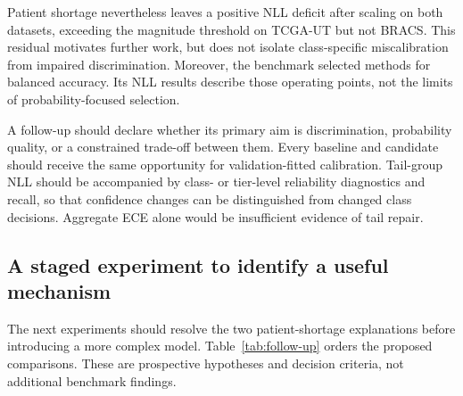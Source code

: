 \documentclass[11pt]{article}
\begin{document}
Patient shortage nevertheless leaves a positive NLL deficit after scaling on both datasets, exceeding the magnitude threshold on TCGA-UT but not BRACS. This residual motivates further work, but does not isolate class-specific miscalibration from impaired discrimination. Moreover, the benchmark selected methods for balanced accuracy. Its NLL results describe those operating points, not the limits of probability-focused selection.

A follow-up should declare whether its primary aim is discrimination, probability quality, or a constrained trade-off between them. Every baseline and candidate should receive the same opportunity for validation-fitted calibration. Tail-group NLL should be accompanied by class- or tier-level reliability diagnostics and recall, so that confidence changes can be distinguished from changed class decisions. Aggregate ECE alone would be insufficient evidence of tail repair.

\subsection{A staged experiment to identify a useful mechanism}
\label{sec:discussion-requirements}
The next experiments should resolve the two patient-shortage explanations before introducing a more complex model. Table~\ref{tab:follow-up} orders the proposed comparisons. These are prospective hypotheses and decision criteria, not additional benchmark findings.
\end{document}
